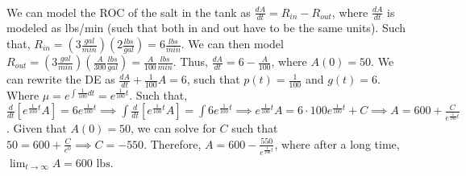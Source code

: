 \documentclass{article}
\begin{document}
\sol \\
We can model the ROC of the salt in the tank as $\frac{dA}{dt} = R_{in} - R_{out}$,
where $\frac{dA}{dt}$ is modeled as lbs/min (such that both in and out have to be the same units).
Such that, $R_{in} = (3 \frac{gal}{min})(2 \frac{lbs}{gal}) = 6 \frac{lbs}{min}$.
We can then model $R_{out} = (3 \frac{gal}{min})(\frac{A}{300} \frac{lbs}{gal}) = \frac{A}{100} \frac{lbs}{min}$.
Thus, $\frac{dA}{dt} = 6 - \frac{A}{100}$, where $A(0) = 50$.
We can rewrite the DE as $\frac{dA}{dt} + \frac{1}{100}A = 6$, such that $p(t) = \frac{1}{100}$ and $g(t) = 6$.
Where $\mu = e^{\int \frac{1}{100} dt} = e^{\frac{1}{100}t}$.
Such that, $\frac{d}{dt} [e^{\frac{1}{100}t}A] = 6e^{\frac{1}{100}t} \implies \int \frac{d}{dt} [e^{\frac{1}{100}t}A] = \int 6e^{\frac{1}{100}t}
\implies e^{\frac{1}{100}t} A = 6 \cdot 100 e^{\frac{1}{100}t} + C \implies A = 600 + \frac{C}{e^{\frac{1}{100}t}}$.
Given that $A(0) = 50$, we can solve for $C$ such that $50 = 600 + \frac{C}{e^0} \implies C = -550$.
Therefore, $A=600-\frac{550}{e^{\frac{1}{100}t}}$, where after a long time, $\lim_{t \to \infty} A = \boxed{600 \text{ lbs}}$.

\end{document}
